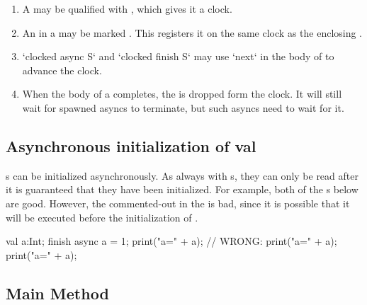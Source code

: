 \begin{enumerate}
\item A  may be qualified with , which gives it a
      clock.
\item An  in a  may be marked .
      This registers it on the same clock as the enclosing .  
\item \xcd`clocked async S` and \xcd`clocked finish S` may use \xcd`next` in
      the body of  to advance the clock.
\item When the body of a  completes, the  is dropped form the clock.  It will still wait for spawned
      asyncs to terminate, but such asyncs need to wait for it.
\end{enumerate}



\subsection{Asynchronous initialization of val}

s can be initialized asynchronously.   As always with s,
they can only be read after it is guaranteed that they have been initialized.
For example, both of the s below are good.  However, the
commented-out  in the  is bad, since it is possible that
it will be executed before the initialization of . 
\begin{xten}
val a:Int;
finish {
  async {
     a = 1; 
     print("a=" + a);
  }
  // WRONG: print("a=" + a);
}
print("a=" + a);
\end{xten}



\subsection{Main Method}

